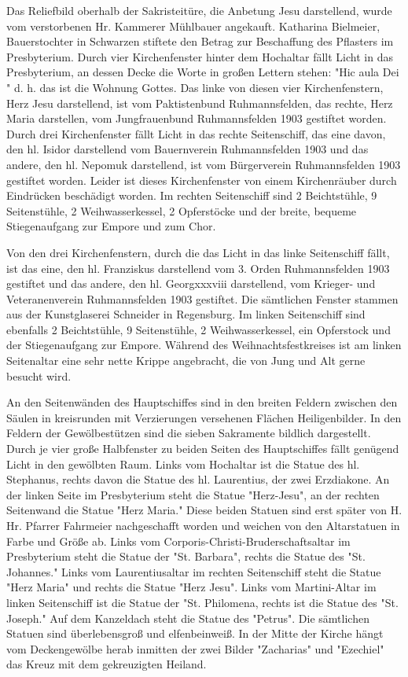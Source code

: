 \documentclass{book}
\begin{document}
Das Reliefbild oberhalb der Sakristeitüre, die Anbetung Jesu darstellend, wurde
vom verstorbenen Hr. Kammerer Mühlbauer angekauft. Katharina Bielmeier,
Bauerstochter in Schwarzen stiftete den Betrag zur Beschaffung des Pflasters im
Presbyterium. Durch vier Kirchenfenster hinter dem Hochaltar fällt Licht in das
Presbyterium, an dessen Decke die Worte in großen Lettern stehen: "Hic aula Dei
" d. h. das ist die Wohnung Gottes. Das linke von diesen vier Kirchenfenstern,
Herz Jesu darstellend, ist vom Paktistenbund Ruhmannsfelden, das rechte, Herz
Maria darstellen, vom Jungfrauenbund Ruhmannsfelden 1903 gestiftet worden. Durch
drei Kirchenfenster fällt Licht in das rechte Seitenschiff, das eine davon, den
hl. Isidor darstellend vom Bauernverein Ruhmannsfelden 1903 und das andere, den
hl. Nepomuk darstellend, ist vom Bürgerverein Ruhmannsfelden 1903 gestiftet
worden. Leider ist dieses Kirchenfenster von einem Kirchenräuber durch
Eindrücken beschädigt worden. Im rechten Seitenschiff sind 2 Beichtstühle, 9
Seitenstühle, 2 Weihwasserkessel, 2 Opferstöcke und der breite, bequeme
Stiegenaufgang zur Empore und zum Chor.

Von den drei Kirchenfenstern, durch die das Licht in das linke Seitenschiff
fällt, ist das eine, den hl. Franziskus darstellend vom 3. Orden Ruhmannsfelden
1903 gestiftet und das andere, den hl. Georgxxxviii darstellend, vom Krieger-
und Veteranenverein Ruhmannsfelden 1903 gestiftet. Die sämtlichen Fenster
stammen aus der Kunstglaserei Schneider in Regensburg. Im linken Seitenschiff
sind ebenfalls 2 Beichtstühle, 9 Seitenstühle, 2 Weihwasserkessel, ein
Opferstock und der Stiegenaufgang zur Empore. Während des Weihnachtsfestkreises
ist am linken Seitenaltar eine sehr nette Krippe angebracht, die von Jung und
Alt gerne besucht wird.

An den Seitenwänden des Hauptschiffes sind in den breiten Feldern zwischen den
Säulen in kreisrunden mit Verzierungen versehenen Flächen Heiligenbilder. In den
Feldern der Gewölbestützen sind die sieben Sakramente bildlich dargestellt.
Durch je vier große Halbfenster zu beiden Seiten des Hauptschiffes fällt
genügend Licht in den gewölbten Raum. Links vom Hochaltar ist die Statue des hl.
Stephanus, rechts davon die Statue des hl. Laurentius, der zwei Erzdiakone. An
der linken Seite im Presbyterium steht die Statue "Herz-Jesu", an der rechten
Seitenwand die Statue "Herz Maria." Diese beiden Statuen sind erst später von H.
Hr. Pfarrer Fahrmeier nachgeschafft worden und weichen von den Altarstatuen in
Farbe und Größe ab. Links vom Corporis-Christi-Bruderschaftsaltar im
Presbyterium steht die Statue der "St. Barbara", rechts die Statue des "St.
Johannes." Links vom Laurentiusaltar im rechten Seitenschiff steht die Statue
"Herz Maria" und rechts die Statue "Herz Jesu". Links vom Martini-Altar im
linken Seitenschiff ist die Statue der "St. Philomena, rechts ist die Statue des
"St. Joseph." Auf dem Kanzeldach steht die Statue des "Petrus". Die sämtlichen
Statuen sind überlebensgroß und elfenbeinweiß. In der Mitte der Kirche hängt vom
Deckengewölbe herab inmitten der zwei Bilder "Zacharias" und "Ezechiel" das
Kreuz mit dem gekreuzigten Heiland.
\end{document}
